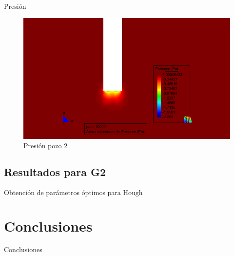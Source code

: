 \documentclass[spanish]{beamer}
\begin{document}
%
\begin{frame}{Presión}
\begin{center}
\begin{figure}[htbp]
\centerline{\includegraphics[scale=0.3]{../img/100m/resul/100_XZ_presion_corte_centro_pozo2}}
\caption{Presión pozo 2}
\end{figure}
\end{center}
\end{frame}
\subsection{Resultados para G2}
%
\begin{frame}{Obtención de parámetros óptimos para Hough}
%
\end{frame}
\section{Conclusiones}
\begin{frame}{Conclusiones}
\end{frame}
%
\end{document}
